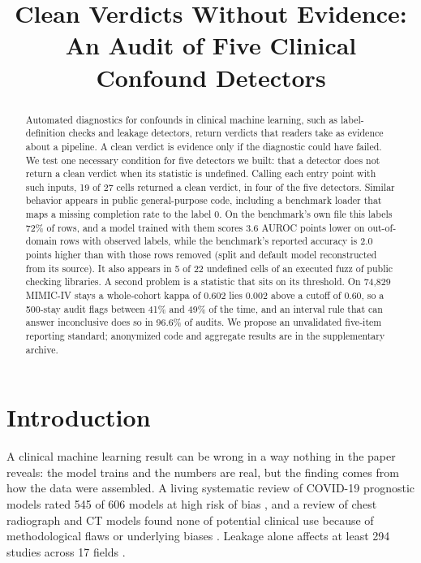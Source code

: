 \documentclass[10pt]{article}
\title{Clean Verdicts Without Evidence: An Audit of Five Clinical Confound Detectors}
\theoremstyle{definition}
\begin{document}
\maketitle

\begin{abstract}
Automated diagnostics for confounds in clinical machine learning, such as label-definition checks and leakage detectors, return verdicts that readers take as evidence about a pipeline. A clean verdict is evidence only if the diagnostic could have failed. We test one necessary condition for five detectors we built: that a detector does not return a clean verdict when its statistic is undefined. Calling each entry point with such inputs, 19 of 27 cells returned a clean verdict, in four of the five detectors. Similar behavior appears in public general-purpose code, including a benchmark loader that maps a missing completion rate to the label 0. On the benchmark's own file this labels 72\% of rows, and a model trained with them scores 3.6 AUROC points lower on out-of-domain rows with observed labels, while the benchmark's reported accuracy is 2.0 points higher than with those rows removed (split and default model reconstructed from its source). It also appears in 5 of 22 undefined cells of an executed fuzz of public checking libraries. A second problem is a statistic that sits on its threshold. On 74,829 MIMIC-IV stays a whole-cohort kappa of 0.602 lies 0.002 above a cutoff of 0.60, so a 500-stay audit flags between 41\% and 49\% of the time, and an interval rule that can answer inconclusive does so in 96.6\% of audits. We propose an unvalidated five-item reporting standard; anonymized code and aggregate results are in the supplementary archive.
\end{abstract}


\section{Introduction}
\label{sec:intro}

A clinical machine learning result can be wrong in a way nothing in the paper reveals: the model trains and the numbers are real, but the finding comes from how the data were assembled. A living systematic review of COVID-19 prognostic models rated 545 of 606 models at high risk of bias \citep{wynants2020prediction}, and a review of chest radiograph and CT models found none of potential clinical use because of methodological flaws or underlying biases \citep{roberts2021common}. Leakage alone affects at least 294 studies across 17 fields \citep{kapoor2023leakage}.
\end{document}
